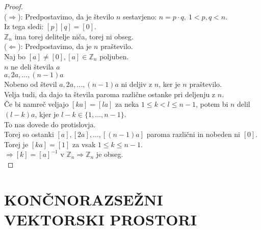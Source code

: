 \documentclass[a4paper,12pt]{article}
\begin{document}
\begin{proof} ~\\

($\Rightarrow$): Predpostavimo, da je število $n$ sestavjeno: $n=p\cdot q,~1<p,q<n$. \\

\noindent Iz tega sledi: $[p][q]=[0]$. \\

\noindent $\mathbb{Z}_n$ ima torej delitelje niča, torej ni obseg.\\

($\Leftarrow$): Predpostavimo, da je $n$ praštevilo. \\

\noindent Naj bo $[a]\neq [0],[a]\in \mathbb{Z}_n$ poljuben. \\

\noindent $n$ ne deli števila $a$ \\

\noindent $a,2a,\ldots,(n-1)a$ \\

\noindent Nobeno od števil $a,2a,\ldots,(n-1)a$ ni deljiv z $n$, ker je $n$ praštevilo. \\

Velja tudi, da dajo ta števila paroma različne ostanke pri deljenju z $n$. \\

Če bi namreč veljajo $[ka]=[la]$ za neka $1\leq k < l \leq n-1$, potem bi $n$ delil $(l-k)a$, kjer je $l-k\in \{1,\ldots,n-1\}$. \\

To nas dovede do protislovja.\\

\noindent Torej so ostanki $[a],[2a],\ldots,[(n-1)a]$ paroma različni in nobeden ni $[0]$. \\

Torej je $[ka]=[1]$ za vsak $1\leq k \leq n-1$. \\

\noindent $\Rightarrow [k]=[a]^{-1}$ v $\mathbb{Z}_n \Rightarrow \mathbb{Z}_n$ je obseg.\\
\end{proof}
\newpage

\section{KONČNORAZSEŽNI VEKTORSKI PROSTORI}
\end{document}
